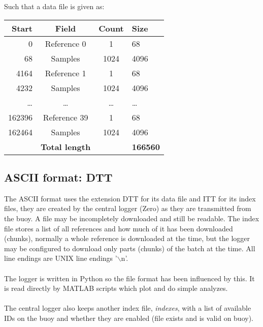 \documentclass[a4paper]{article}
\begin{document}
\begin{multicols}{2}
  \vspace{1em}
  Such that a data file is given as: \\
  \vspace{1em}

  \begin{tabular}{|r|c|c|l|}
    \hline
    \bfseries Start   &     \bfseries Field     &   \bfseries Count
    &   \bfseries Size  \\ \hline
    0   & Reference 0 & 1 & 68 \\ \hline
    68  & Samples   & 1024 & 4096 \\ \hline
    4164 & Reference 1 & 1 & 68 \\ \hline
    4232  & Samples   & 1024 & 4096 \\ \hline
    \dots & \dots & \dots & \dots \\ \hline
    162396 & Reference 39 & 1 & 68 \\ \hline
    162464 & Samples   & 1024 & 4096 \\ \hline
    & \textbf{Total length} &  & \textbf{166560} \\ \hline
  \end{tabular}
  \label{tab:data_binary_fields}


  \subsection{ASCII format: DTT}
  The ASCII format uses the extension DTT for its data file and ITT for
  its index files, they are created by the central logger (Zero) as
  they are transmitted from the buoy. A file may be incompletely
  downloaded and still be readable. The index file stores a list of all
  references and how much of it has been downloaded (chunks), normally
  a whole reference is downloaded at the time, but the logger may be
  configured to download only parts (chunks) of the batch at the time.
  All line endings are UNIX line endings '$\backslash$n'.

  \paragraph{}The logger is written in Python so the file format has
  been influenced by this. It is read directly by MATLAB scripts
  which plot and do simple analyzes.

  \paragraph{}The central logger also keeps another index file,
  \textit{indexes}, with a list of available IDs on the buoy and whether
  they are enabled (file exists and is valid on buoy).


\end{multicols}
\end{document}
